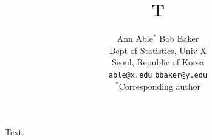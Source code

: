 \documentclass{article}
\begin{document}
\title{T}
\author{Ann Able$^{*}$ \qquad Bob Baker\\ Dept of Statistics, Univ X\\ Seoul, Republic of Korea\\ \texttt{able@x.edu} \qquad \texttt{bbaker@y.edu}\\ $^{*}$Corresponding author}
\maketitle
Text.
\end{document}
